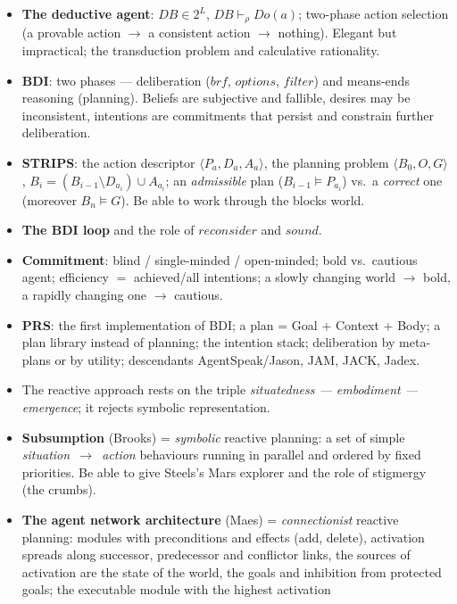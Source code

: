\documentclass[11pt,a4paper]{article}
\theoremstyle{definition}
\begin{document}
\begin{itemize}
\item \textbf{The deductive agent}: $\mathit{DB} \in 2^L$,
  $\mathit{DB} \vdash_\rho \mathit{Do}(a)$; two-phase action selection (a provable action $\to$
  a consistent action $\to$ nothing). Elegant but impractical; the transduction problem and
  calculative rationality.
\item \textbf{BDI}: two phases --- deliberation ($\mathit{brf}$, $\mathit{options}$,
  $\mathit{filter}$) and means-ends reasoning (planning). Beliefs are subjective and fallible,
  desires may be inconsistent, intentions are commitments that persist and constrain further
  deliberation.
\item \textbf{STRIPS}: the action descriptor $\langle P_a,D_a,A_a\rangle$, the planning problem
  $\langle B_0,O,G\rangle$, $B_i = (B_{i-1}\setminus D_{a_i})\cup A_{a_i}$;
  an \emph{admissible} plan ($B_{i-1}\models P_{a_i}$) vs.\ a \emph{correct} one (moreover
  $B_n \models G$). Be able to work through the blocks world.
\item \textbf{The BDI loop} and the role of $\mathit{reconsider}$ and $\mathit{sound}$.
\item \textbf{Commitment}: blind / single-minded / open-minded; bold vs.\ cautious agent;
  efficiency $=$ achieved/all intentions; a slowly changing world $\to$ bold, a rapidly changing
  one $\to$ cautious.
\item \textbf{PRS}: the first implementation of BDI; a plan = Goal + Context + Body; a plan
  library instead of planning; the intention stack; deliberation by meta-plans or by utility;
  descendants AgentSpeak/Jason, JAM, JACK, Jadex.
\item The reactive approach rests on the triple \emph{situatedness --- embodiment ---
  emergence}; it rejects symbolic representation.
\item \textbf{Subsumption} (Brooks) = \emph{symbolic} reactive planning: a set of simple
  \emph{situation~$\to$~action} behaviours running in parallel and ordered by fixed priorities.
  Be able to give Steels's Mars explorer and the role of stigmergy (the crumbs).
\item \textbf{The agent network architecture} (Maes) = \emph{connectionist} reactive planning:
  modules with preconditions and effects (add, delete), activation spreads along successor,
  predecessor and conflictor links, the sources of activation are the state of the world, the
  goals and inhibition from protected goals; the executable module with the highest activation

\end{itemize}
\end{document}
